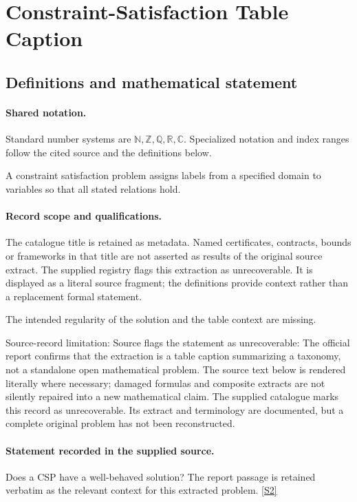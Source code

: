 \documentclass[11pt]{article}
\newcommand{\sref}[2]{\hyperlink{source:#1:#2}{[S#2]}}
\begin{document}
\section{Constraint-Satisfaction Table Caption}\label{statement}

\subsection{Definitions and mathematical statement}

\paragraph{Shared notation.}Standard number systems are $\mathbb N,\mathbb Z,\mathbb Q,\mathbb R,\mathbb C$. Specialized notation and index ranges follow the cited source and the definitions below.


A constraint satisfaction problem assigns labels from a specified domain to variables so that all stated relations hold.
\paragraph{Record scope and qualifications.}
The catalogue title is retained as metadata. Named certificates, contracts, bounds or frameworks in that title are not asserted as results of the original source extract.
The supplied registry flags this extraction as unrecoverable. It is displayed as a literal source fragment; the definitions provide context rather than a replacement formal statement.

The intended regularity of the solution and the table context are missing.

Source-record limitation: Source flags the statement as unrecoverable: The official report confirms that the extraction is a table caption summarizing a taxonomy, not a standalone open mathematical problem.
The source text below is rendered literally where necessary; damaged formulas and composite extracts are not silently repaired into a new mathematical claim.
The supplied catalogue marks this record as unrecoverable. Its extract and terminology are documented, but a complete original problem has not been reconstructed.
\paragraph{Statement recorded in the supplied source.}
Does a CSP have a well-behaved solution? The report passage is retained verbatim as the relevant context for this extracted problem. \sref{statement}{2}
\end{document}
